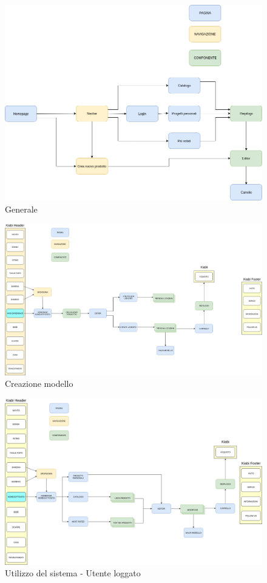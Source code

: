 \documentclass[12pt,italian,]{report}
\begin{document}
\begin{figure}[h]
\centering
\includegraphics{img/Generale_Kids_Experience.png}
\caption{Generale}
\end{figure}

\begin{figure}[h]
\centering
\includegraphics{img/Creazione_modello.png}
\caption{Creazione modello}
\end{figure}

\begin{figure}[h]
\centering
\includegraphics{img/Utente_loggato.png}
\caption{Utilizzo del sistema - Utente loggato}
\end{figure}
\end{document}

